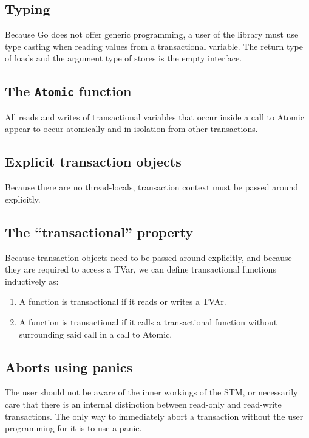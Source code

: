 \documentclass[12pt,a4paper,oneside,openright]{report}
\newcommand{\goFunc}[1]{\texttt{#1}}
\begin{document}
\subsection{Typing}
\label{sec:typing}

Because Go does not offer generic programming, a user of the library
must use type casting when reading values from a transactional
variable. The return type of loads and the argument type of stores is
the empty interface.

\subsection{The \goFunc{Atomic} function}
\label{sec:atomic-function}

All reads and writes of transactional variables that occur inside a
call to Atomic appear to occur atomically and in isolation from other
transactions.

\subsection{Explicit transaction objects}
\label{sec:expl-trans-objects}

Because there are no thread-locals, transaction context must be passed
around explicitly.

\subsection{The ``transactional'' property}
\label{sec:cont-trans-prop}

Because transaction objects need to be passed around explicitly, and
because they are required to access a TVar, we can define
transactional functions inductively as:

\begin{enumerate}
\item A function is transactional if it reads or writes a TVAr.
\item A function is transactional if it calls a transactional function
  without surrounding said call in a call to Atomic.
\end{enumerate}

\subsection{Aborts using panics}
\label{sec:aborts-using-panics}

The user should not be aware of the inner workings of the STM, or
necessarily care that there is an internal distinction between
read-only and read-write transactions. The only way to immediately
abort a transaction without the user programming for it is to use a
panic.
\end{document}
